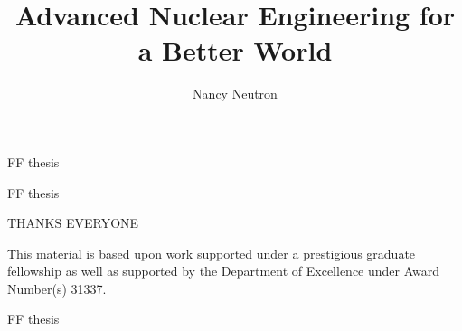 \documentclass{ucbthesis}
\def\StripPrefix#1>{}
\def\jobis#1{FF\fi
  \def\predicate{#1}%
  \edef\predicate{\expandafter\StripPrefix\meaning\predicate}%
  \edef\job{\jobname}%
  \ifx\job\predicate
}
\begin{document}

\title{Advanced Nuclear Engineering for a Better World}
\author{Nancy Neutron}

\if\jobis{thesis}

  \maketitle
  \approvalpage
  \copyrightpage

  
\fi

\begin{frontmatter}


\setcounter{secnumdepth}{3}
\setcounter{tocdepth}{3}

\if\jobis{thesis}
  \tableofcontents
  \clearpage
  \listoffigures
  \clearpage
  \listoftables

\begin{acknowledgements}

THANKS EVERYONE

\vspace{\fill}

\footnotesize{This material is based upon work supported under a prestigious
graduate fellowship as well as supported by the Department 
of Excellence under Award Number(s) 31337.}

\end{acknowledgements}
\fi
  
\end{frontmatter}

\pagestyle{headings}








\if\jobis{thesis}
  \printbibliography
\else
  \newpage
  \renewcommand{\thepage}{}
  \printbibliography
\fi

% 
\end{document}
